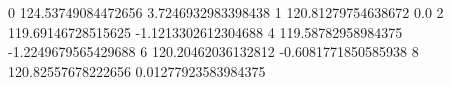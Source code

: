 0 124.53749084472656 3.7246932983398438
1 120.81279754638672 0.0
2 119.69146728515625 -1.1213302612304688
4 119.58782958984375 -1.2249679565429688
6 120.20462036132812 -0.6081771850585938
8 120.82557678222656 0.01277923583984375
